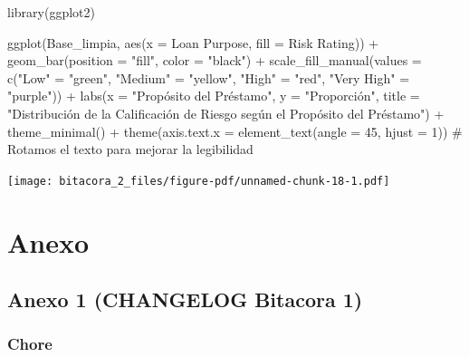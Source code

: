 \documentclass[
  letterpaper,
  DIV=11,
  numbers=noendperiod]{scrreprt}
\newenvironment{Shaded}{\begin{snugshade}}{\end{snugshade}}
\newcommand{\AttributeTok}[1]{\textcolor[rgb]{0.40,0.45,0.13}{#1}}
\newcommand{\CommentTok}[1]{\textcolor[rgb]{0.37,0.37,0.37}{#1}}
\newcommand{\DecValTok}[1]{\textcolor[rgb]{0.68,0.00,0.00}{#1}}
\newcommand{\FunctionTok}[1]{\textcolor[rgb]{0.28,0.35,0.67}{#1}}
\newcommand{\NormalTok}[1]{\textcolor[rgb]{0.00,0.23,0.31}{#1}}
\newcommand{\OtherTok}[1]{\textcolor[rgb]{0.00,0.23,0.31}{#1}}
\newcommand{\SpecialCharTok}[1]{\textcolor[rgb]{0.37,0.37,0.37}{#1}}
\newcommand{\StringTok}[1]{\textcolor[rgb]{0.13,0.47,0.30}{#1}}
\begin{document}
\begin{Shaded}
\begin{Highlighting}[]
\FunctionTok{library}\NormalTok{(ggplot2)}

\FunctionTok{ggplot}\NormalTok{(Base\_limpia, }\FunctionTok{aes}\NormalTok{(}\AttributeTok{x =} \StringTok{\textasciigrave{}}\AttributeTok{Loan Purpose}\StringTok{\textasciigrave{}}\NormalTok{, }\AttributeTok{fill =} \StringTok{\textasciigrave{}}\AttributeTok{Risk Rating}\StringTok{\textasciigrave{}}\NormalTok{)) }\SpecialCharTok{+}  
  \FunctionTok{geom\_bar}\NormalTok{(}\AttributeTok{position =} \StringTok{"fill"}\NormalTok{, }\AttributeTok{color =} \StringTok{"black"}\NormalTok{) }\SpecialCharTok{+}  
  \FunctionTok{scale\_fill\_manual}\NormalTok{(}\AttributeTok{values =} \FunctionTok{c}\NormalTok{(}\StringTok{"Low"} \OtherTok{=} \StringTok{"green"}\NormalTok{, }\StringTok{"Medium"} \OtherTok{=} \StringTok{"yellow"}\NormalTok{, }\StringTok{"High"} \OtherTok{=} \StringTok{"red"}\NormalTok{, }\StringTok{"Very High"} \OtherTok{=} \StringTok{"purple"}\NormalTok{)) }\SpecialCharTok{+}  
  \FunctionTok{labs}\NormalTok{(}\AttributeTok{x =} \StringTok{"Propósito del Préstamo"}\NormalTok{, }\AttributeTok{y =} \StringTok{"Proporción"}\NormalTok{, }\AttributeTok{title =} \StringTok{"Distribución de la Calificación de Riesgo según el Propósito del Préstamo"}\NormalTok{) }\SpecialCharTok{+} 
  \FunctionTok{theme\_minimal}\NormalTok{() }\SpecialCharTok{+}
  \FunctionTok{theme}\NormalTok{(}\AttributeTok{axis.text.x =} \FunctionTok{element\_text}\NormalTok{(}\AttributeTok{angle =} \DecValTok{45}\NormalTok{, }\AttributeTok{hjust =} \DecValTok{1}\NormalTok{))  }\CommentTok{\# Rotamos el texto para mejorar la legibilidad}
\end{Highlighting}
\end{Shaded}

\texttt{[image: bitacora\_2\_files/figure-pdf/unnamed-chunk-18-1.pdf]}


\chapter{Anexo}\label{anexo}

\section{Anexo 1 (CHANGELOG Bitacora
1)}\label{anexo-1-changelog-bitacora-1}

\subsection{Chore}\label{chore}
\end{document}
